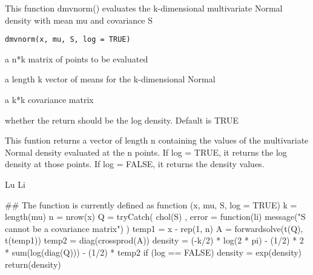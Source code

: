 \documentclass[a4paper]{book}
\begin{document}
%
\begin{Description}\relax

This function dmvnorm() evaluates the k-dimensional multivariate Normal density with mean mu and covariance S
\end{Description}
%
\begin{Usage}
\begin{verbatim}
dmvnorm(x, mu, S, log = TRUE)
\end{verbatim}
\end{Usage}
%
\begin{Arguments}
\begin{ldescription}
\item[\code{x}] 

a n*k matrix of points to be evaluated
\item[\code{mu}] 

a length k vector of means for the k-dimensional Normal
\item[\code{S}] 

a k*k covariance matrix
\item[\code{log}] 

whether the return should be the log density. Default is TRUE
\end{ldescription}
\end{Arguments}
%
\begin{Value}





This funtion returns a vector of length n containing the values of the multivariate Normal density evaluated at the n points. If log = TRUE, it returns the log density at those points. If log = FALSE, it returns the density values.
\end{Value}
%
\begin{Author}\relax

Lu Li
\end{Author}
%
\begin{Examples}
\begin{ExampleCode}


## The function is currently defined as
function (x, mu, S, log = TRUE) 
{
    k = length(mu)
    n = nrow(x)
    Q = tryCatch({
        chol(S)
    }, error = function(li) {
        message("S cannot be a covariance matrix")
    })
    temp1 = x - rep(1, n) %
    A = forwardsolve(t(Q), t(temp1))
    temp2 = diag(crossprod(A))
    density = (-k/2) * log(2 * pi) - (1/2) * 2 * sum(log(diag(Q))) - 
        (1/2) * temp2
    if (log == FALSE) {
        density = exp(density)
    }
    return(density)
  }
\end{ExampleCode}
\end{Examples}
\end{document}
